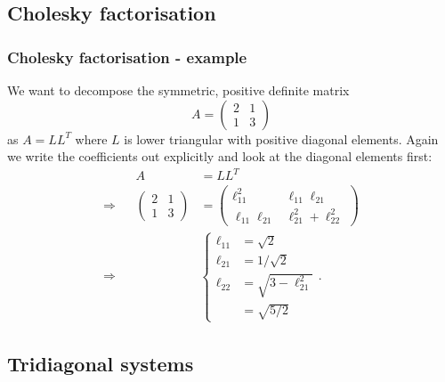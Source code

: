 \documentclass{beamer}
\begin{document}
\subsection{Cholesky factorisation}


\begin{frame}
  \frametitle{Cholesky factorisation - example}
  
  We want to decompose the symmetric, positive definite matrix
  \begin{equation*}
    A =
    \begin{pmatrix}
      2 & 1 \\
      1 & 3
    \end{pmatrix}
  \end{equation*}
  as $A = L L^T$ where $L$ is lower triangular with positive diagonal
  elements. \pause Again we write the coefficients out explicitly and
  look at the diagonal elements first:
  \begin{align*}
                && A & = L L^T \\
    \Rightarrow &&
    \begin{pmatrix}
      2 & 1 \\
      1 & 3
    \end{pmatrix}
    & =
    \begin{pmatrix}
      \ell_{1 1}^2 & \ell_{1 1} \ell_{2 1} \\
      \ell_{1 1} \ell_{2 1} & \ell_{2 1}^2 +  \ell_{2 2}^2
    \end{pmatrix} \\ 
    \Rightarrow && &\left\{ 
      \begin{aligned}
        \ell_{1 1} & = \sqrt{2} \\
        \ell_{2 1} & = 1 / \sqrt{2} \\
        \ell_{2 2} & = \sqrt{3 - \ell_{2 1}^2} \\
                   & = \sqrt{5/2}
      \end{aligned}\right. .
  \end{align*}

\end{frame}


\subsection{Tridiagonal systems}
\end{document}
